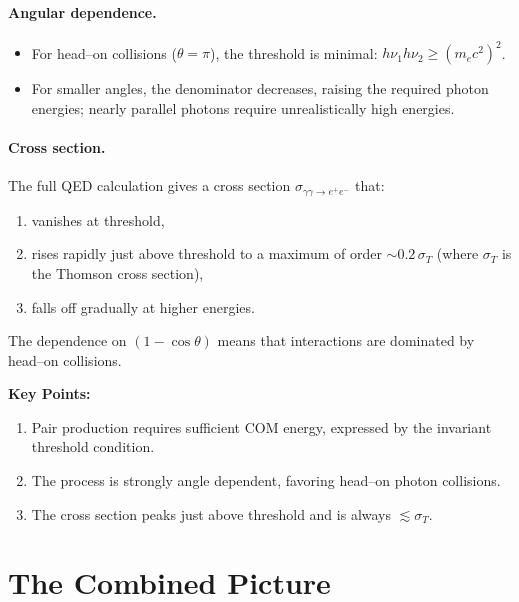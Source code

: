 \paragraph{Angular dependence.}
\begin{itemize}
    \item For head--on collisions ($\theta = \pi$), the threshold is
          minimal: $h\nu_1 h\nu_2 \geq (m_e c^2)^2$.
    \item For smaller angles, the denominator decreases, raising the
          required photon energies; nearly parallel photons require
          unrealistically high energies.
\end{itemize}

\paragraph{Cross section.}
The full QED calculation gives a cross section
$\sigma_{\gamma\gamma\rightarrow e^+e^-}$ that:
\begin{enumerate}
    \item vanishes at threshold,
    \item rises rapidly just above threshold to a maximum of order
          $\sim 0.2\,\sigma_T$ (where $\sigma_T$ is the Thomson cross
          section),
    \item falls off gradually at higher energies.
\end{enumerate}
The dependence on $(1-\cos\theta)$ means that interactions are
dominated by head--on collisions.

\begin{remark}
    \textbf{Key Points:}
    \begin{enumerate}
        \item Pair production requires sufficient COM energy, expressed
              by the invariant threshold condition.
        \item The process is strongly angle dependent, favoring head--on
              photon collisions.
        \item The cross section peaks just above threshold and is always
              $\lesssim \sigma_T$.
    \end{enumerate}
\end{remark}

\section{The Combined Picture}

